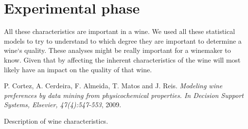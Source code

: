 \documentclass[11pt]{article}
\begin{document}
\part{Experimental phase} \label{part:experimenting}







All these characteristics are important in a wine.
We used all these statistical models to try to understand to which degree they are important
to determine a wine`s quality.
These analyses might be really important for a winemaker to know.
Given that by affecting the inherent characteristics of the wine will most likely have an
impact on the quality of that wine.





\begin{thebibliography}{1}
 P. Cortez, A. Cerdeira, F. Almeida, T. Matos and J. Reis. {\em Modeling wine preferences by data mining from physicochemical properties.
In Decision Support Systems, Elsevier, 47(4):547-553},  2009.
\end{thebibliography}


\clearpage
\begin{table}
    \centering
    \caption{Description of wine characteristics.}
    \resizebox{\columnwidth}{!}{
    
    }
    \label{tab:description_wine}
\end{table}
\end{document}
